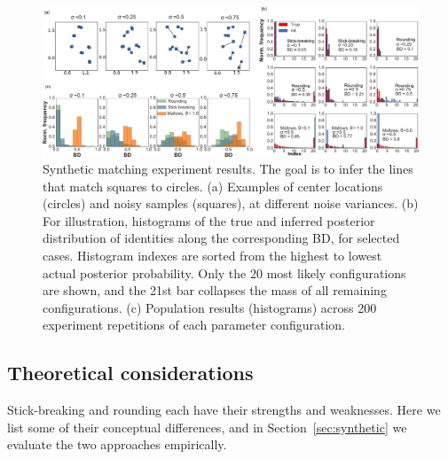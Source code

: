 \documentclass[twoside]{article}
\begin{document}
\begin{figure}[ht] 
   \centering
   \includegraphics[width=1.0\textwidth]{../figures/figure8.pdf}
   \caption{Synthetic matching experiment results. The goal is to infer the lines that match squares to circles. (a) Examples of center locations (circles) and noisy samples (squares), at different noise variances. (b) For illustration, histograms of the true and inferred posterior distribution of identities along the corresponding BD, for selected cases. Histogram indexes are sorted from the highest to lowest actual posterior probability. Only the 20 most likely configurations are shown, and the 21st bar collapses the mass of all remaining configurations. (c) Population results (histograms) across 200 experiment repetitions of each parameter configuration.}
   \label{fig:synthetic}
\end{figure}

\subsection{Theoretical considerations}

Stick-breaking and rounding each have their strengths and weaknesses.
Here we list some of their conceptual differences, and in
Section~\ref{sec:synthetic} we evaluate the two approaches
empirically.
\end{document}

